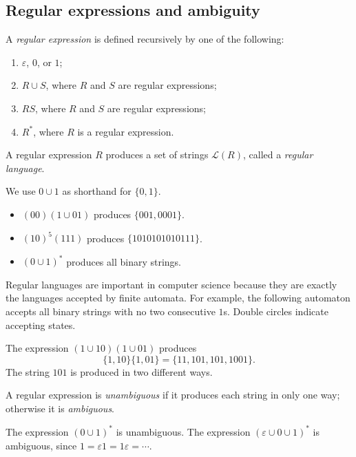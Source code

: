 \subsection{Regular expressions and ambiguity}
\begin{definition}
A \textit{regular expression} is defined recursively by one of the following:
\begin{enumerate}
\item $\varepsilon$, $0$, or $1$;
\item $R\cup S$, where $R$ and $S$ are regular expressions;
\item $RS$, where $R$ and $S$ are regular expressions;
\item $R^*$, where $R$ is a regular expression.
\end{enumerate}
A regular expression $R$ produces a set of strings $\mathcal L(R)$, called a \textit{regular language}.
\end{definition}
We use $0\cup1$ as shorthand for $\{0,1\}$.
\begin{example}
\leavevmode\par
\begin{itemize}
\item $(00)(1\cup01)$ produces $\{001,0001\}$.
\item $(10)^5(111)$ produces $\{1010101010111\}$.
\item $(0\cup1)^*$ produces all binary strings.
\end{itemize}
\end{example}
Regular languages are important in computer science because they are exactly the languages accepted by finite automata. For example, the following automaton accepts all binary strings with no two consecutive $1$s. Double circles indicate accepting states.

\begin{example}
The expression $(1\cup10)(1\cup01)$ produces
\[
\{1,10\}\{1,01\}=\{11,101,101,1001\}.
\]
The string $101$ is produced in two different ways.
\end{example}
\begin{definition}
A regular expression is \textit{unambiguous} if it produces each string in only one way; otherwise it is \textit{ambiguous}.
\end{definition}
\begin{example}
The expression $(0\cup1)^*$ is unambiguous. The expression $(\varepsilon\cup0\cup1)^*$ is ambiguous, since $1=\varepsilon1=1\varepsilon=\cdots$.
\end{example}
